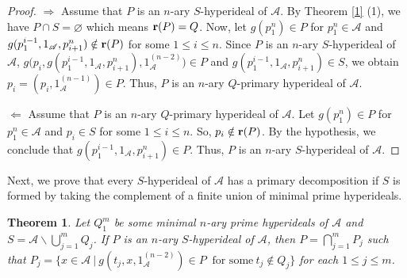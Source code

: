 \documentclass[preprint,review,10pt]{amsart}
\newtheorem{theorem}{Theorem}[section]
\theoremstyle{definition}
\theoremstyle{remark}
\numberwithin{equation}{section}
\begin{document}
\begin{proof}
$\Longrightarrow$ Assume that $P$ is an $n$-ary $S$-hyperideal of $\mathscr{A}$. By Theorem \ref{1} (1), we have $P \cap S=\varnothing$ which means $ {\bf r}(P)=Q$. Now, let $g(p^n _1) \in P$ for  $p_1^ n \in \mathscr{A}$ and $g(p_1^{i-1}, 1_\mathscr{A}, p_{ i+1}^n) \notin {\bf r}(P)$ for some $ 1 \leq i \leq n$. Since $P$ is an $n$-ary $S$-hyperideal of $\mathscr{A}$, $g\big(p_i,g(p_1^{i-1}, 1_\mathscr{A}, p_{ i+1}^n),1_\mathscr{A}^{(n-2)}\big) \in P$ and $g(p_1^{i-1}, 1_\mathscr{A}, p_{ i+1}^n) \in S$, we obtain $p_i=(p_i,1_\mathscr{A}^{(n-1)}) \in P$. Thus, $P$ is an $n$-ary $Q$-primary hyperideal of $\mathscr{A}$.

$\Longleftarrow$ Assume that $P$ is an $n$-ary $Q$-primary hyperideal of $\mathscr{A}$. Let $g(p^n _1) \in P$ for  $p_1^ n \in \mathscr{A}$ and $p_i \in S$ for some $ 1 \leq i \leq n$. So, $p_i \notin {\bf r}(P)$. By the hypothesis, we conclude that $g(p_1^{i-1}, 1_\mathscr{A}, p_{ i+1}^n) \in P$. Thus, $P$ is an $n$-ary $S$-hyperideal of $\mathscr{A}$.
\end{proof}
Next, we prove that every $S$-hyperideal of $\mathscr{A}$ has a primary decomposition if $S$ is formed by taking the complement of a finite union of minimal prime hyperideals.
\begin{theorem} \label{complement}
Let $Q_1^m$  be some  minimal $n$-ary prime hyperideals of $\mathscr{A}$ and $S=\mathscr{A} \backslash \bigcup_{j=1}^mQ_j$. If $P$ is an $n$-ary $S$-hyperideal of $\mathscr{A}$, then $P=\bigcap_{j=1}^mP_j$ such that $P_j=\{x \in \mathscr{A} \ \vert \ g(t_j,x,1_\mathscr{A}^{(n-2)}) \in P \ \text{ for some} \ t_j \notin Q_j\}$ for each $1 \leq j \leq m$.
\end{theorem}
\end{document}
